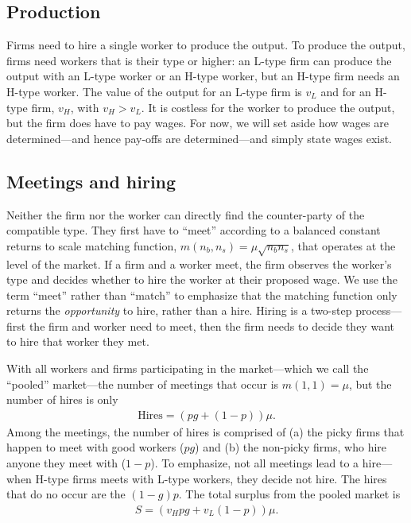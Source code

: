 \documentclass[12pt]{article}
\begin{document}
\subsection{Production} 
Firms need to hire a single worker to produce the output.
To produce the output, firms need workers that is their type or higher:
an L-type firm can produce the output with an L-type worker or an H-type worker, but an H-type firm needs an H-type worker.
The value of the output for an L-type firm is $v_L$ and for an H-type firm, $v_H$, with $v_H > v_L$.
It is costless for the worker to produce the output, but the firm does have to pay wages. 
For now, we will set aside how wages are determined---and hence pay-offs are determined---and simply state wages exist.

\subsection{Meetings and hiring}
Neither the firm nor the worker can directly find the counter-party of the compatible type.
They first have to ``meet'' according to a balanced constant returns to scale matching function, $m(n_b, n_s) = \mu \sqrt{n_b n_s}$, that operates at the level of the market.
If a firm and a worker meet, the firm observes the worker's type and decides whether to hire the worker at their proposed wage.
We use the term ``meet'' rather than ``match'' to emphasize that the matching function only returns the \emph{opportunity} to hire, rather than a hire.
Hiring is a two-step process---first the firm and worker need to meet, then the firm needs to decide they want to hire that worker they met.

With all workers and firms participating in the market---which we call the ``pooled'' market---the number of meetings that occur is $m(1,1) = \mu$, but the number of hires is only
\begin{align*}
\mbox{Hires} = \left( pg + (1 - p) \right)\mu.
\end{align*}
Among the meetings, the number of hires is comprised of (a) the picky firms that happen to meet with good workers ($pg$) and (b) the non-picky firms, who hire anyone they meet with ($1-p$).
To emphasize, not all meetings lead to a hire---when H-type firms meets with L-type workers, they decide not hire.
The hires that do no occur are the $(1-g)p$.
The total surplus from the pooled market is 
\begin{align}
  S = \left(v_H pg + v_L (1 - p) \right)\mu.
\end{align}
\end{document}
